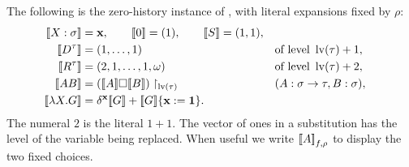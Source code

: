 The following is the zero-history instance of
\cite[Definition~3.1]{ww}, with literal expansions fixed by $\rho$:
\begin{align*}
 \can{X:\sigma}&=\mathbf x,\qquad
 \can0=(1),\qquad \can S=(1,1),\\
 \can{D^\tau}&=(1,\ldots,1)
                &&\text{of level }\lv(\tau)+1,\\
 \can{R^\tau}&=(2,1,\ldots,1,\omega)
                &&\text{of level }\lv(\tau)+2,\\
 \can{AB}&=(\can A\square\can B)\upharpoonright_{\lv(\tau)}
                &&(A:\sigma\to\tau, B:\sigma),\\
 \can{\lambda X.G}&=\delta^{\mathbf x}\can G+
                        \can G\{\mathbf x:=\mathbf1\}.
\end{align*}
The numeral $2$ is the literal $1+1$.  The vector of ones in a
substitution has the level of the variable being replaced.  When useful
we write $\mathopen{[\![}A\mathclose{]\!]}_{f,\rho}$ to display the two fixed choices.

